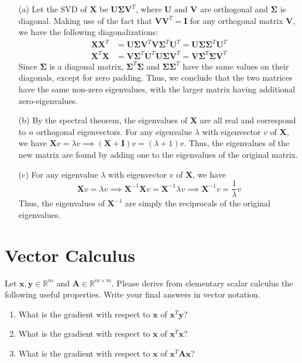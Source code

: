 \documentclass[submit]{harvardml}
\newcommand{\R}{\mathbb{R}}
\renewcommand{\v}[1]{\mathbf{#1}}
\begin{document}
\begin{enumerate}
	\item[(a)] Let the SVD of $\v X$ be $\v U\v\Sigma \v V^T$, where $\v U$ and $\v V$ are orthogonal and $\v \Sigma$ is diagonal. Making use of the fact that $\v V \v V^T = \v I$ for any orthogonal matrix $\v V$, we have the following diagonalizations:
	\begin{align*}
	\v X\v X^T &= \v U\v\Sigma\v V^T\v V\v\Sigma^T\v U^T = \v U\v\Sigma\v\Sigma^T\v U^T \\
	\v X^T\v X &= \v V\v\Sigma^T \v U^T\v U\v\Sigma\v V^T = \v V\v\Sigma^T\v\Sigma\v V^T
	\end{align*}
	Since $\v\Sigma$ is a diagonal matrix, $\v\Sigma^T\v\Sigma$ and $\v\Sigma\v\Sigma^T$ have the same values on their diagonals, except for zero padding. Thus, we conclude that the two matrices have the same non-zero eigenvalues, with the larger matrix having additional zero-eigenvalues.
	
	\item[(b)] By the spectral theorem, the eigenvalues of $\v X$ are all real and correspond to $n$ orthogonal eigenvectors. For any eigenvalue $\lambda$ with eigenvector $v$ of $\v X$, we have $\v X v = \lambda v \implies (\v X + \v I) v = (\lambda + 1) v$. Thus, the eigenvalues of the new matrix are found by adding one to the eigenvalues of the original matrix.
	
	\item[(c)] For any eigenvalue $\lambda$ with eigenvector $v$ of $\v X$, we have 
	\[\v X v = \lambda v \implies \v X^{-1} \v X v = \v X^{-1} \lambda v \implies \v X^{-1} v = \frac{1}{\lambda} v\]
	Thus, the eigenvalues of $\v X^{-1}$ are simply the reciprocals of the original eigenvalues.
\end{enumerate}


\newpage
\section*{Vector Calculus}
\begin{problem}
  Let $\v x, \v y \in \R^m$ and $\v A \in \R^{m \times m}$. Please derive from
  elementary scalar calculus the following useful properties. Write
  your final answers in vector notation.
\begin{enumerate}[label=(\alph*)]
    \item What is the gradient with respect to $\v x$ of $\v x^T \v y$?
    \item What is the gradient with respect to $\v x$ of $\v x^T \v x$?
    \item What is the gradient with respect to $\v x$ of $\v x^T \v A \v x$?
\end{enumerate}
\end{problem}
\end{document}
